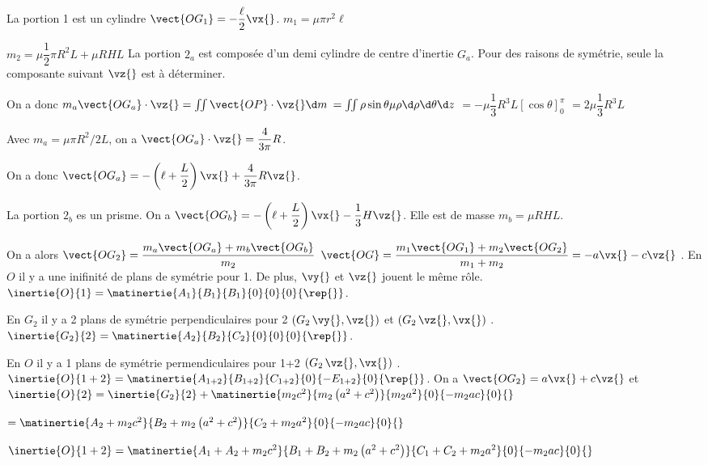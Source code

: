 \begin{corrigebox}
La portion 1 est un cylindre $\vect{OG_1} = -\dfrac{\ell}{2}\vx{}$.
$m_1 =\mu \pi r^2 \ell$

$m_2 = \mu \dfrac{1}{2} \pi R^2 L + \mu RHL$
La portion $2_a$ est composée d'un demi cylindre de centre d'inertie $G_a$. Pour des raisons de symétrie, seule la composante suivant $\vz{}$ est à déterminer.

On a donc $m_a \vect{OG_a}\cdot \vz{} = \iint \vect{OP}\cdot \vz{} \d m$ 
$ =\iint \rho \sin \theta \mu      \rho \d\rho \d \theta \d z$  
$ = - \mu    \dfrac{1}{3}R^3  L \left[ \cos \theta \right]_{0}^{\pi}  $  
$ =  2 \mu    \dfrac{1}{3}R^3  L $

Avec $m_a = \mu \pi R^2/2L$, on a $ \vect{OG_a}\cdot \vz{} = \dfrac{4}{3\pi}R  $.

On a donc $\vect{OG_a}=-\left(\ell+\dfrac{L}{2}\right) \vx{}+\dfrac{4}{3\pi}R \vz{}$.

La portion $2_b$ es un prisme. On a $\vect{OG_b}=-\left(\ell+\dfrac{L}{2}\right) \vx{}-\dfrac{1}{3}H \vz{}$. Elle est de masse $m_b = \mu RHL$.

On a alors $\vect{OG_2} = \dfrac{m_a \vect{OG_a} + m_b \vect{OG_b} }{m_2}$
$\vect{OG} = \dfrac{m_1 \vect{OG_1} + m_2 \vect{OG_2} }{m_1+m_2} =-a\vx{}-c\vz{}$ .
En $O$ il y a une inifinité de plans de symétrie pour 1. De plus, $\vy{}$ et $\vz{}$ jouent le même rôle. 
$\inertie{O}{1} = \matinertie{A_1}{B_1}{B_1}{0}{0}{0}{\rep{}}$.

En $G_2$ il y a 2 plans de symétrie perpendiculaires pour 2 $(G_2\,\vy{},\vz{})$ et $(G_2\,\vz{},\vx{})$ .
$\inertie{G_2}{2} = \matinertie{A_2}{B_2}{C_2}{0}{0}{0}{\rep{}}$.

En $O$ il y a 1 plans de symétrie permendiculaires pour 1+2  $(G_2\,\vz{},\vx{})$ .
$\inertie{O}{1+2} = \matinertie{A_{1+2}}{B_{1+2}}{C_{1+2}}{0}{-E_{1+2}}{0}{\rep{}}$.
On a  $\vect{OG_2} = a\vx{}+c\vz{}$ et 
$\inertie{O}{2} = \inertie{G_2}{2} + \matinertie{m_2c^2}{m_2 \left(a^2+c^2\right)}{m_2a^2}{0}{-m_2 ac }{0}{}$

$=\matinertie{A_2+m_2c^2}{B_2 + m_2 \left(a^2+c^2\right)}{C_2 + m_2a^2}{0}{-m_2 ac }{0}{}$

$\inertie{O}{1+2} =\matinertie{A_1 + A_2+m_2c^2}{B_1 + B_2 + m_2 \left(a^2+c^2\right)}{C_1 + C_2 + m_2a^2}{0}{-m_2 ac }{0}{}$
\end{corrigebox}
